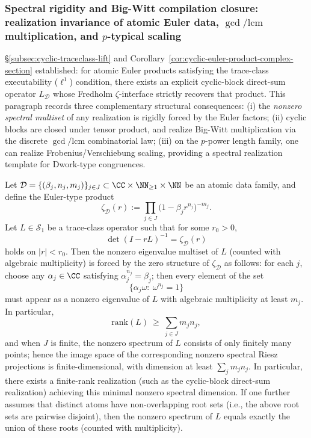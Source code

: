 \subsubsection{Spectral rigidity and Big-Witt compilation closure: realization invariance of atomic Euler data, \texorpdfstring{$\gcd/\mathrm{lcm}$}{gcd/lcm} multiplication, and \texorpdfstring{$p$}{p}-typical scaling}\label{subsec:operator-cyclic-traceclass-witt-rigidity}
\S\ref{subsec:cyclic-traceclass-lift} and Corollary~\ref{cor:cyclic-euler-product-complex-section} established: for atomic Euler products satisfying the trace-class executability (\(\ell^1\)) condition, there exists an explicit cyclic-block direct-sum operator \(L_{\mathcal D}\) whose Fredholm \(\zeta\)-interface strictly recovers that product.
This paragraph records three complementary structural consequences:
(i) the \emph{nonzero spectral multiset} of any realization is rigidly forced by the Euler factors;
(ii) cyclic blocks are closed under tensor product, and realize Big-Witt multiplication via the discrete \(\gcd/\mathrm{lcm}\) combinatorial law;
(iii) on the \(p\)-power length family, one can realize Frobenius/Verschiebung scaling, providing a spectral realization template for Dwork-type congruences.

\begin{proposition}\label{prop:cyclic-euler-spectral-rigidity}
Let \(\mathcal D=\{(\beta_j,n_j,m_j)\}_{j\in J}\subset \CC\times\NN_{\ge 1}\times\NN\) be an atomic data family, and define the Euler-type product
\[
\zeta_{\mathcal D}(r):=\prod_{j\in J}\bigl(1-\beta_j r^{n_j}\bigr)^{-m_j}.
\]
Let \(L\in\mathcal{S}_1\) be a trace-class operator such that for some \(r_0>0\),
\[
\det(I-rL)^{-1}=\zeta_{\mathcal D}(r)
\]
holds on \(|r|<r_0\).
Then the nonzero eigenvalue multiset of \(L\) (counted with algebraic multiplicity) is forced by the zero structure of \(\zeta_{\mathcal D}\) as follows:
for each \(j\), choose any \(\alpha_j\in\CC\) satisfying \(\alpha_j^{n_j}=\beta_j\); then every element of the set
\[
\{\alpha_j\omega:\ \omega^{n_j}=1\}
\]
must appear as a nonzero eigenvalue of \(L\) with algebraic multiplicity at least \(m_j\).
In particular,
\[
\mathrm{rank}(L)\ \ge\ \sum_{j\in J}m_jn_j,
\]
and when \(J\) is finite, the nonzero spectrum of \(L\) consists of only finitely many points; hence the image space of the corresponding nonzero spectral Riesz projections is finite-dimensional, with dimension at least \(\sum_{j}m_jn_j\).
In particular, there exists a finite-rank realization (such as the cyclic-block direct-sum realization) achieving this minimal nonzero spectral dimension.
If one further assumes that distinct atoms have non-overlapping root sets (i.e., the above root sets are pairwise disjoint), then the nonzero spectrum of \(L\) equals exactly the union of these roots (counted with multiplicity).
\end{proposition}

